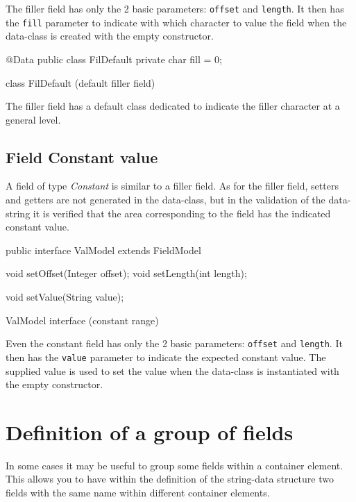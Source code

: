 \documentclass[a4paper,10pt]{report}
\newenvironment{elisting}[1][H]
  {\captionsetup{aboveskip=0pt}\begin{listing}[#1]}
  {\end{listing}%
}
\begin{document}
The filler field has only the 2 basic parameters: \verb!offset! and 
\verb!length!. It then has the \verb!fill! parameter to indicate with which 
character to value the field when the data-class is created with the empty 
constructor.

\begin{elisting}[!htb]
\begin{javacode}
@Data
public class FilDefault {
    private char fill = 0;
}
\end{javacode}
\caption{class FilDefault (default filler field)}
\label{lst:FilDefault}
\end{elisting}

The filler field has a default class dedicated to indicate the filler character 
at a general level.

\section{Field Constant value}
A field of type \textsl{Constant} is similar to a filler field. As for the 
filler field, setters and getters are not generated in the data-class, but in 
the validation of the data-string it is verified that the area corresponding to 
the field has the indicated constant value.

\begin{elisting}[!htb]
\begin{javacode}
public interface ValModel extends FieldModel {
    void setOffset(Integer offset);
    void setLength(int length);
    
    void setValue(String value);
}
\end{javacode}
\caption{ValModel interface (constant range)}
\label{lst:ValModel}
\end{elisting}

Even the constant field has only the 2 basic parameters: \verb!offset! and 
\verb!length!. It then has the \verb!value! parameter to indicate the expected 
constant value. The supplied value is used to set the value when the data-class 
is instantiated with the empty constructor.


\chapter{Definition of a group of fields}
In some cases it may be useful to group some fields within a container element. 
This allows you to have within the definition of the string-data structure two 
fields with the same name within different container elements.
\end{document}
